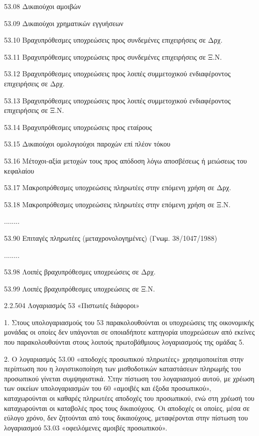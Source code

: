 \documentclass[A4,10pt,greek]{book}
\begin{document}
        53.08   Δικαιούχοι αμοιβών

        53.09   Δικαιούχοι χρηματικών εγγυήσεων

        53.10   Βραχυπρόθεσμες υποχρεώσεις προς συνδεμένες επιχειρήσεις σε Δρχ.

        53.11   Βραχυπρόθεσμες υποχρεώσεις προς συνδεμένες επιχειρήσεις σε Ξ.Ν.

        53.12   Βραχυπρόθεσμες υποχρεώσεις προς λοιπές συμμετοχικού
                     ενδιαφέροντος επιχειρήσεις σε Δρχ.

        53.13   Βραχυπρόθεσμες υποχρεώσεις προς λοιπές συμμετοχικού
                     ενδιαφέροντος επιχειρήσεις σε Ξ.Ν.

        53.14   Βραχυπρόθεσμες υποχρεώσεις προς εταίρους

        53.15   Δικαιούχοι ομολογιούχοι παροχών επί πλέον τόκου

        53.16   Μέτοχοι-αξία μετοχών τους προς απόδοση λόγω αποσβέσεως
                     ή μειώσεως του κεφαλαίου

        53.17   Μακροπρόθεσμες υποχρεώσεις πληρωτέες στην επόμενη χρήση
                     σε Δρχ.

        53.18   Μακροπρόθεσμες υποχρεώσεις πληρωτέες στην επόμενη χρήση
                     σε Ξ.Ν.

        ........

        53.90   Επιταγές πληρωτέες (μεταχρονολογημένες)
                     (Γνωμ. 38/1047/1988)

        ........

        53.98   Λοιπές βραχυπρόθεσμες υποχρεώσεις σε Δρχ.

        53.99   Λοιπές βραχυπρόθεσμες υποχρεώσεις σε Ξ.Ν.

 

2.2.504 Λογαριασμός 53 «Πιστωτές διάφοροι»

1. Στους υπολογαριασμούς του 53 παρακολουθούνται οι υποχρεώσεις της οικονομικής μονάδας οι οποίες δεν υπάγονται σε οποιαδήποτε κατηγορία υποχρεώσεων από εκείνες που παρακολουθούνται στους λοιπούς πρωτοβάθμιους λογαριασμούς της ομάδας 5.

2. Ο λογαριασμός 53.00 «αποδοχές προσωπικού πληρωτέες» χρησιμοποιείται στην περίπτωση που η λογιστικοποίηση των μισθοδοτικών καταστάσεων πληρωμής του προσωπικού γίνεται συμψηφιστικά. Στην πίστωση του λογαριασμού αυτού, με χρέωση των οικείων υπολογαριασμών του 60 «αμοιβές και έξοδα προσωπικού», καταχωρούνται οι καθαρές πληρωτέες αποδοχές του προσωπικού, ενώ στη χρέωσή του καταχωρούνται οι καταβολές προς τους δικαιούχους. Οι αποδοχές οι οποίες, μέσα σε εύλογο χρόνο, δεν ζητούνται από τους δικαιούχους, μεταφέρονται στην πίστωση του λογαριασμού 53.03 «οφειλόμενες αμοιβές προσωπικού».
\end{document}
